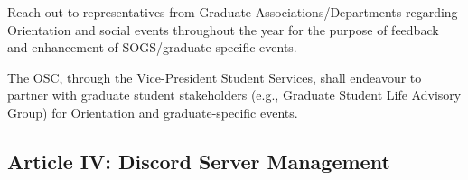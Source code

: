 \begin{longenum}[ label*=\thesubsection.\arabic*., align=left]
\begin{longenum}[label*=\arabic*., align=left]
\begin{longenum}[label*=\arabic*., align=left]
			\item Reach out to representatives from Graduate Associations/Departments regarding Orientation and social events throughout the year for the purpose of feedback and enhancement of SOGS/graduate-specific events.
			\end{longenum}
		\item The OSC, through the Vice-President Student Services, shall endeavour to partner with graduate student stakeholders (e.g., Graduate Student Life Advisory Group) for Orientation and graduate-specific events.
		\end{longenum}
\end{longenum}

\subsection{Article IV: Discord Server Management}
